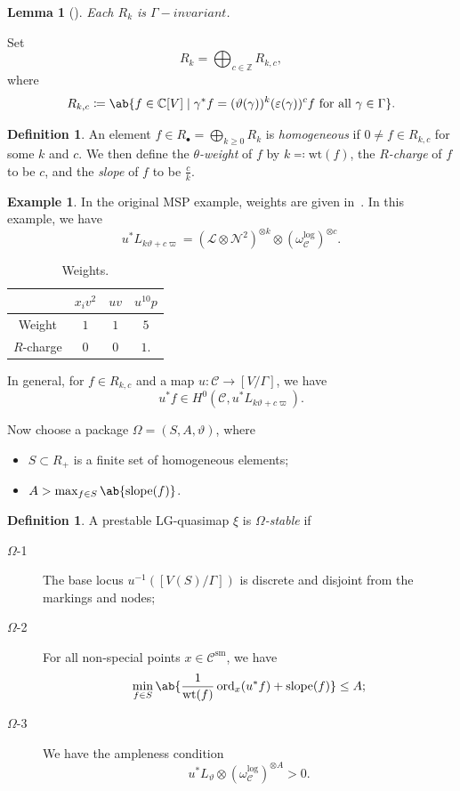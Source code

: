 \documentclass[10pt,oldfontcommands,oneside]{memoir}
\newtheorem{lem}[thm]{Lemma}
\theoremstyle{definition}
\newtheorem{defn}[thm]{Definition}
\newtheorem{exm}[thm]{Example}
\theoremstyle{remark}
\theoremstyle{plain}
\theoremstyle{definition}
\theoremstyle{remark}
\newcommand{\C}{\mathbb{C}}
\newcommand{\Z}{\mathbb{Z}}
\newcommand{\ep}{\varepsilon}
\newcommand{\mc}[1]{\mathcal{#1}}
\newcommand{\mr}[1]{\mathrm{#1}}
\newcommand{\on}[1]{\operatorname{#1}}
\newcommand{\1}{\mathbf{1}}
\newcommand{\2}{\mathbf{2}}
\newcommand{\3}{\mathbf{3}}
\begin{document}
\begin{lem}[\cite{glsm}]
    Each $R_k$ is $\Gamma-invariant$. 
\end{lem}
Set
\[ R_k = \bigoplus_{c \in \Z} R_{k,c}, \]
where
\[ R_{k,c} \coloneqq \ab\{ f \in \C[V] \mid \gamma^* f = (\vartheta(\gamma))^k (\ep(\gamma))^c f \text{ for all }\gamma \in \Gamma \}. \]

\begin{defn}
    An element $f \in R_{\bullet} = \bigoplus_{k \geq 0} R_k$ is \textit{homogeneous} if $0 \neq f \in R_{k,c}$ for some $k$ and $c$. We then define the \textit{$\theta$-weight} of $f$ by $k \eqqcolon \mr{wt}(f)$, the \textit{$R$-charge} of $f$ to be $c$, and the \textit{slope} of $f$ to be $\frac{c}{k}$.
\end{defn}

\begin{exm}
    In the original MSP example, weights are given in~.
    In this example, we have
    \[ u^* L_{k\vartheta+c\varpi} = (\mc{L} \otimes \mc{N}^2)^{\otimes k} \otimes (\omega_{\mc{C}}^{\log})^{\otimes c}. \]
    \begin{table}[htpb]
        \centering
        \caption{Weights.}
        \label{tab:weights}
        \begin{tabular}{cccc}
            \toprule
            & $x_i v^2$ & $uv$ & $u^{10} p$ \\
            \midrule
            Weight & $1$ & $1$ & $5$ \\
            $R$-charge & $0$ & $0$ & $1$.\\
            \bottomrule
        \end{tabular}
    \end{table}
\end{exm}

In general, for $f \in R_{k,c}$ and a map $u \colon \mc{C} \to [V/\Gamma]$, we have
\[ u^* f \in H^0(\mc{C}, u^*L_{k\vartheta + c\varpi}). \]

Now choose a package $\Omega = (S,A,\vartheta)$, where
\begin{itemize}
    \item $S \subset R_+$ is a finite set of homogeneous elements;
    \item $A > \max_{f \in S} \ab\{\on{slope}(f) \}$.
\end{itemize}

\begin{defn}
    A prestable LG-quasimap $\xi$ is \textit{$\Omega$-stable} if
    \begin{description}
        \item[$\Omega$-1] The base locus $u^{-1}( [ V(S)/\Gamma] )$ is discrete and disjoint from the markings and nodes;
        \item[$\Omega$-2] For all non-special points $x \in \mc{C}^{\mr{sm}}$, we have
            \[ \min_{f \in S} \ab\{ \frac{1}{\mr{wt}(f)} \on{ord}_x (u^* f) + \on{slope}(f)\} \leq A; \]
        \item[$\Omega$-3] We have the ampleness condition
            \[ u^* L_{\vartheta} \otimes (\omega_{\mc{C}}^{\log})^{\otimes A} > 0. \]
    \end{description}
\end{defn}
\end{document}

